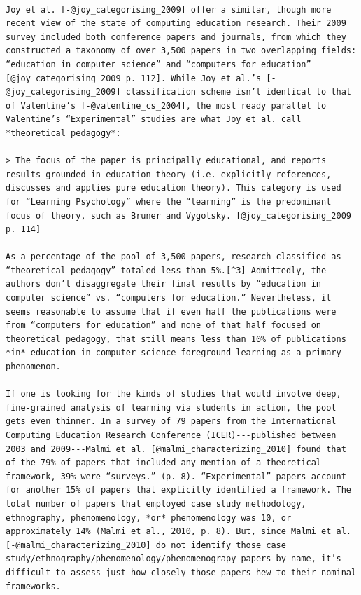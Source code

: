 \begin{verbatim}

Joy et al. [-@joy_categorising_2009] offer a similar, though more recent view of the state of computing education research. Their 2009 survey included both conference papers and journals, from which they constructed a taxonomy of over 3,500 papers in two overlapping fields: “education in computer science” and “computers for education” [@joy_categorising_2009 p. 112]. While Joy et al.’s [-@joy_categorising_2009] classification scheme isn’t identical to that of Valentine’s [-@valentine_cs_2004], the most ready parallel to Valentine’s “Experimental” studies are what Joy et al. call *theoretical pedagogy*:

> The focus of the paper is principally educational, and reports results grounded in education theory (i.e. explicitly references, discusses and applies pure education theory). This category is used for “Learning Psychology” where the “learning” is the predominant focus of theory, such as Bruner and Vygotsky. [@joy_categorising_2009 p. 114]

As a percentage of the pool of 3,500 papers, research classified as “theoretical pedagogy” totaled less than 5%.[^3] Admittedly, the authors don’t disaggregate their final results by “education in computer science” vs. “computers for education.” Nevertheless, it seems reasonable to assume that if even half the publications were from “computers for education” and none of that half focused on theoretical pedagogy, that still means less than 10% of publications *in* education in computer science foreground learning as a primary phenomenon.

If one is looking for the kinds of studies that would involve deep, fine-grained analysis of learning via students in action, the pool gets even thinner. In a survey of 79 papers from the International Computing Education Research Conference (ICER)---published between 2003 and 2009---Malmi et al. [@malmi_characterizing_2010] found that of the 79% of papers that included any mention of a theoretical framework, 39% were “surveys.” (p. 8). “Experimental” papers account for another 15% of papers that explicitly identified a framework. The total number of papers that employed case study methodology, ethnography, phenomenology, *or* phenomenology was 10, or approximately 14% (Malmi et al., 2010, p. 8). But, since Malmi et al. [-@malmi_characterizing_2010] do not identify those case study/ethnography/phenomenology/phenomenograpy papers by name, it’s difficult to assess just how closely those papers hew to their nominal frameworks.


\end{verbatim}
